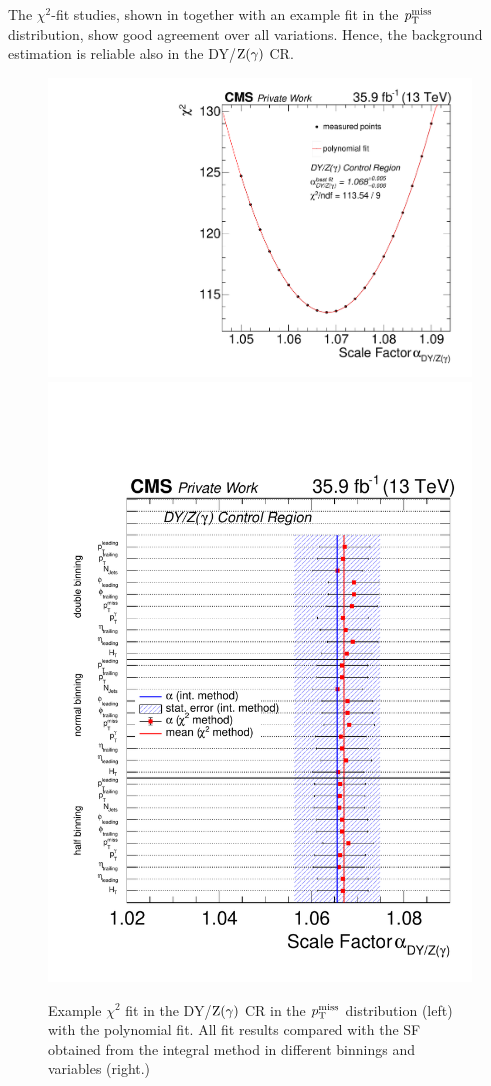 The $\chi^2$-fit studies, shown in  together with an example fit in the $p_{\mathrm{T}}^\text{miss}$ distribution, show good agreement over all variations. Hence, the background estimation is reliable also in the DY/$\mathrm{Z}(\gamma)$ CR.

\begin{figure}[tbp]
 \centering
 \includegraphics[width=\pairwidth]{figures/plots_CR/chi/DY_LL_met}
 \includegraphics[width=\pairwidth]{figures/plots_CR/chi/DY_CompareLL}
 \caption{Example $\chi^2$ fit in the DY/$\mathrm{Z}(\gamma)$ CR in the $p_{\mathrm{T}}^\text{miss}$ distribution (left) with the polynomial fit. All fit results compared with the SF obtained from the integral method in different binnings and variables (right.)}
 \label{fig:chiDY}
\end{figure}
